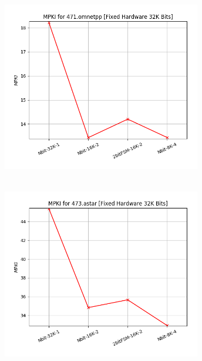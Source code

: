    \begin{minipage}{\textwidth}
      \begin{center}
         \\
         \vspace{3mm}
         \includegraphics[width=0.65\textwidth, frame]{./graphs/4-2ii/471-omnetpp.png}
         \vspace{6mm}
      \end{center}
   \end{minipage}

   \begin{minipage}{\textwidth}
      \begin{center}
         \\
         \vspace{3mm}
         \includegraphics[width=0.65\textwidth, frame]{./graphs/4-2ii/473-astar.png}
         \vspace{6mm}
      \end{center}
   \end{minipage}

